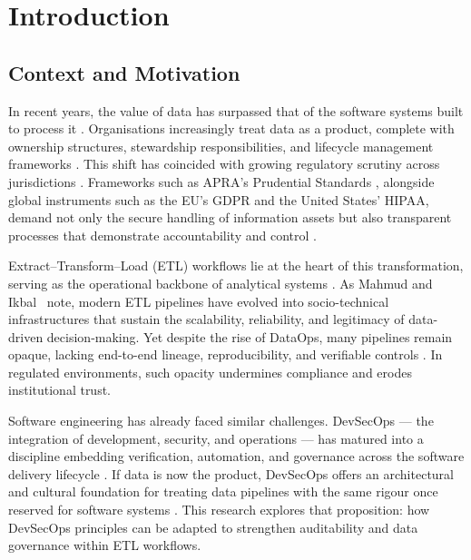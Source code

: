 \chapter{Introduction}

\section{Context and Motivation}
\noindent
In recent years, the value of data has surpassed that of the software systems
built to process it \cite{elbaghazaoui_data_2025, elbaghazaoui_ensuring_2025}.
Organisations increasingly treat data as a product, complete with ownership
structures, stewardship responsibilities, and lifecycle management frameworks
\cite{elbaghazaoui_data_2025}. This shift has coincided with growing regulatory
scrutiny across jurisdictions \cite{elbaghazaoui_data_2025}. Frameworks such as
APRA’s Prudential Standards \cite{cps234,cps230,cps510,
australian_prudential_regulation_authority_prudential_2013}, alongside global
instruments such as the EU’s GDPR and the United States’ HIPAA, demand not only
the secure handling of information assets but also transparent processes that
demonstrate accountability and control \cite{elbaghazaoui_ensuring_2025}.

Extract–Transform–Load (ETL) workflows lie at the heart of this transformation,
serving as the operational backbone of analytical systems
\cite{elbaghazaoui_metadata_2025, elbaghazaoui_data_2025-1}. As Mahmud and
Ikbal~\cite{mahmud_role_2022} note, modern ETL pipelines have evolved into
socio-technical infrastructures that sustain the scalability, reliability, and
legitimacy of data-driven decision-making. Yet despite the rise of DataOps,
many pipelines remain opaque, lacking end-to-end lineage, reproducibility, and
verifiable controls \cite{elbaghazaoui_ensuring_2025}. In regulated
environments, such opacity undermines compliance and erodes institutional
trust.

Software engineering has already faced similar challenges. DevSecOps — the
integration of development, security, and operations — has matured into a
discipline embedding verification, automation, and governance across the
software delivery lifecycle \cite{anisetti_devsecops-based_2022,
castellanos_accordant_2021, anisetti_semi-automatic_2020,
elbaghazaoui_integrating_2025-1}. If data is now the product, DevSecOps offers
an architectural and cultural foundation for treating data pipelines with the
same rigour once reserved for software systems \cite{elbaghazaoui_integrating_2025}.
This research explores that proposition: how DevSecOps principles can be adapted
to strengthen auditability and data governance within ETL workflows.

